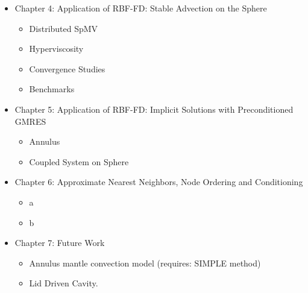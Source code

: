 \begin{itemize}
	\item Chapter 4: Application of RBF-FD: Stable Advection on the Sphere
	\begin{itemize} 
		\item Distributed SpMV
		\item Hyperviscosity
		\item Convergence Studies
		\item Benchmarks
	\end{itemize} 
\end{itemize}

\begin{itemize}
	\item Chapter 5: Application of RBF-FD: Implicit Solutions with Preconditioned GMRES
	\begin{itemize} 
		\item Annulus
		\item Coupled System on Sphere
	\end{itemize} 
\end{itemize}

\begin{itemize}
	\item Chapter 6: Approximate Nearest Neighbors, Node Ordering and Conditioning
	\begin{itemize} 
		\item a
		\item b
	\end{itemize} 
\end{itemize}

\begin{itemize}
	\item Chapter 7: Future Work
	\begin{itemize} 
		\item Annulus mantle convection model (requires: SIMPLE method)
		\item Lid Driven Cavity. 
	\end{itemize}
\end{itemize}

